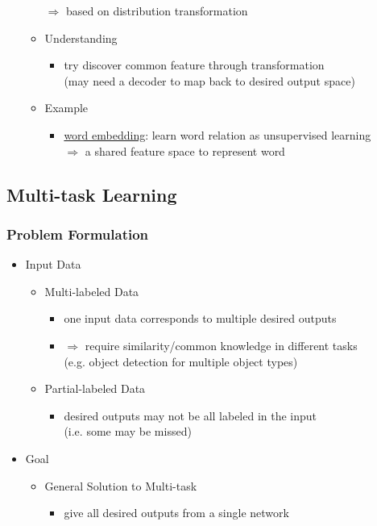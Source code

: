 \begin{itemize}
\begin{itemize}
		$\Rightarrow$ based on distribution transformation
	\item Understanding
		\begin{itemize}
		\item try discover common feature through transformation \\ 
		(may need a decoder to map back to desired output space)
		\end{itemize}
	\item Example
		\begin{itemize}
		\item \hyperref[DL_NLP_Langrep]{word embedding}: learn word relation as unsupervised learning \\
		$\Rightarrow$ a shared feature space to represent word
		\end{itemize}
	\end{itemize}
\end{itemize}


\subsection{Multi-task Learning}
\subsubsection{Problem Formulation}
\begin{itemize}
\item Input Data
	\begin{itemize}
	\item Multi-labeled Data
		\begin{itemize}
		\item one input data corresponds to multiple desired outputs
		\item $\Rightarrow$ require similarity/common knowledge in different tasks \\
		(e.g. object detection for multiple object types)
		\end{itemize}
	\item Partial-labeled Data
		\begin{itemize}
		\item desired outputs may not be all labeled in the input \\ 
		(i.e. some may be missed)
		\end{itemize}
	\end{itemize}
\item Goal
	\begin{itemize}
	\item General Solution to Multi-task
		\begin{itemize}
		\item give all desired outputs from a single network
		\end{itemize}
	\end{itemize}
\end{itemize}
